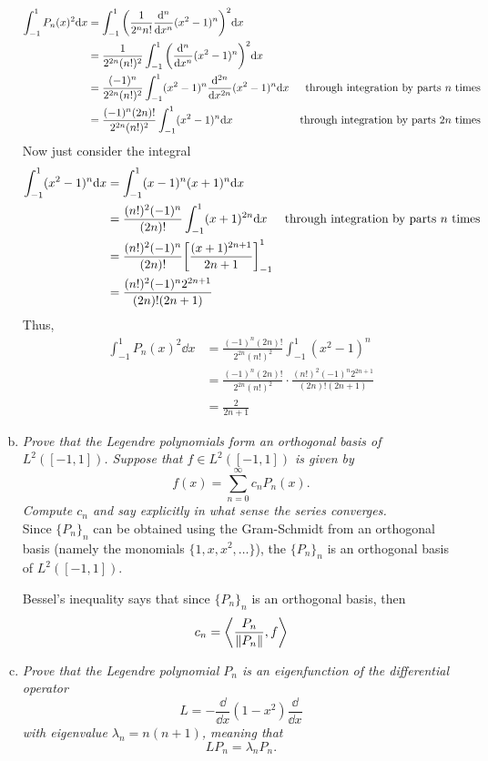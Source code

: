 \documentclass[12pt]{article}
\theoremstyle{plain}
\begin{document}
\begin{enumerate}[(a)]
        \begin{align*}
            \int_{-1}^1 P_n(x)^2 \dd x &= \int_{-1}^1 \qty(\frac{1}{2^n n!}\frac{\dd^n}{\dd x^n}(x^2 - 1)^n)^2\dd x \\
            &= \frac{1}{2^{2n}(n!)^2}\int_{-1}^1\qty(\frac{\dd^n}{\dd x^n}(x^2 - 1)^n)^2 \dd x \\
            &= \frac{(-1)^n}{2^{2n}(n!)^2}\int_{-1}^1 (x^2 - 1)^n \frac{\dd^{2n}}{\dd x^{2n}}(x^2 - 1)^n \dd x &\text{through integration by parts $n$ times} \\
            &= \frac{(-1)^n(2n)!}{2^{2n}(n!)^2}\int_{-1}^1(x^2 - 1)^n \dd x &\text{through integration by parts $2n$ times}
        \end{align*}
        Now just consider the integral
        \begin{align*}
            \int_{-1}^1 (x^2 - 1)^n \dd x &= \int_{-1}^1 (x-1)^n (x+1)^n \dd x \\
            &= \frac{(n!)^2(-1)^n}{(2n)!}\int_{-1}^1 (x+1)^{2n}\dd x &\text{through integration by parts $n$ times} \\
            &= \frac{(n!)^2(-1)^n}{(2n)!}\qty[\frac{(x + 1)^{2n+1}}{2n+1}]_{-1}^1 \\
            &= \frac{(n!)^2(-1)^n 2^{2n+1}}{(2n)!(2n+1)}
        \end{align*}
        Thus,
        \begin{align*}
            \int_{-1}^1 P_n(x)^2 \dd x &= \frac{(-1)^n(2n)!}{2^{2n}(n!)^2}\int_{-1}^1(x^2 - 1)^n \\
            &= \frac{(-1)^n(2n)!}{2^{2n}(n!)^2}\cdot\frac{(n!)^2(-1)^n 2^{2n+1}}{(2n)!(2n+1)} \\
            &= \frac{2}{2n + 1}
        \end{align*}
    \item
        \emph{Prove that the Legendre polynomials form an orthogonal basis of $L^2([-1, 1])$.  Suppose that $f \in L^2([-1,1])$ is given by $$f(x) = \sum_{n=0}^\infty c_n P_n(x).$$  Compute $c_n$ and say explicitly in what sense the series converges.} \\

        Since $\{P_n\}_n$ can be obtained using the Gram-Schmidt from an orthogonal basis (namely the monomials $\{1, x, x^2, \dots\}$), the $\{P_n\}_n$ is an orthogonal basis of $L^2([-1,1])$.

        Bessel's inequality says that since $\{P_n\}_n$ is an orthogonal basis, then
        \begin{align*}
            c_n = \left\langle \frac{P_n}{\norm{P_n}}, f \right\rangle
        \end{align*}
    \item
        \emph{Prove that the Legendre polynomial $P_n$ is an eigenfunction of the differential operator $$L = -\frac{\dd}{\dd x}(1 - x^2) \frac{\dd}{\dd x}$$ with eigenvalue $\lambda_n = n(n+1)$, meaning that $$LP_n = \lambda_n P_n.$$}


\end{enumerate}
\end{document}
